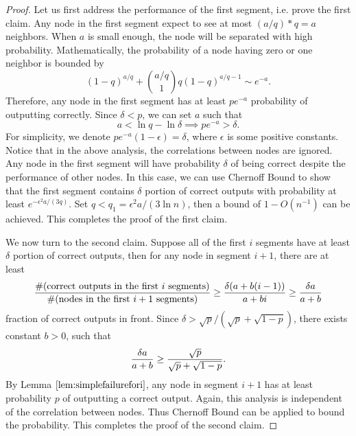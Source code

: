 \documentclass[a4paper,UKenglish]{lipics}
\theoremstyle{definition}
\begin{document}
\begin{proof}
Let us first address the performance of the first segment, i.e. prove the first claim.
Any node in the first segment expect to see at most $(a/q)*q = a$ neighbors.
When $a$ is small enough, the node will be separated with high probability.
Mathematically, the probability of a node having zero or one neighbor is bounded by
\begin{equation*}
	(1-q)^{a/q} + {a/q \choose 1}q(1-q)^{a/q - 1} 
\sim
	e^{-a}.
\end{equation*}
Therefore, any node in the first segment has at least $pe^{-a}$ probability of outputting correctly.
Since $\delta < p$, we can set $a$ such that
\begin{equation*}
	a < \ln q - \ln \delta 
	\implies 
	pe^{-a} > \delta.
\end{equation*}
For simplicity, we denote $pe^{-a}(1-\epsilon) = \delta$, where $\epsilon$ is some positive constants.
Notice that in the above analysis, the correlations between nodes are ignored.
Any node in the first segment will have probability $\delta$ of being correct despite the performance of other nodes.
In this case, we can use Chernoff Bound to show that the first segment 
	contains $\delta$ portion of correct outputs with probability at least $e^{-\epsilon^2a/(3q)}$.
Set $q < q_1 = \epsilon^2a / (3\ln n)$, then a bound of $1 - O(n^{-1})$ can be achieved. 
This completes the proof of the first claim.

We now turn to the second claim.
Suppose all of the first $i$ segments have at least $\delta$ portion of correct outputs,
	then for any node in segment $i+1$, there are at least 
\begin{equation*}
	{\#(\text{correct outputs in the first $i$ segments}) \over \#(\text{nodes in the first $i+1$ segments})}
\ge
	{\delta(a + b(i-1)) \over a + bi } 
\ge 
	{\delta a\over a + b}
\end{equation*}
fraction of correct outputs in front.
Since $\delta > \sqrt{p}/(\sqrt{p}+\sqrt{1-p})$, there exists constant $b > 0$, such that
\begin{equation*}
	{\delta a\over a + b} 
\ge 
	{\sqrt{p}\over \sqrt{p}+\sqrt{1-p}}.
\end{equation*}
By Lemma $\ref{lem:simplefailurefori}$, any node in segment $i+1$ has at least probability $p$ of outputting a correct output.
Again, this analysis is independent of the correlation between nodes.
Thus Chernoff Bound can be applied to bound the probability.
This completes the proof of the second claim.
\end{proof}
\end{document}
